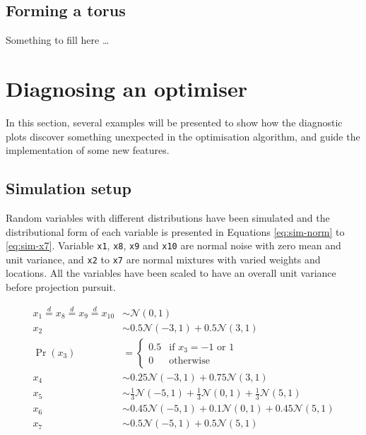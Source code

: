 \hypertarget{forming-a-torus}{%
\subsection{Forming a torus}\label{forming-a-torus}}

Something to fill here \ldots{}

\hypertarget{application}{%
\section{Diagnosing an optimiser}\label{application}}

In this section, several examples will be presented to show how the
diagnostic plots discover something unexpected in the optimisation
algorithm, and guide the implementation of some new features.

\hypertarget{simulation-setup}{%
\subsection{Simulation setup}\label{simulation-setup}}

Random variables with different distributions have been simulated and
the distributional form of each variable is presented in Equations
\ref{eq:sim-norm} to \ref{eq:sim-x7}. Variable \texttt{x1}, \texttt{x8},
\texttt{x9} and \texttt{x10} are normal noise with zero mean and unit
variance, and \texttt{x2} to \texttt{x7} are normal mixtures with varied
weights and locations. All the variables have been scaled to have an
overall unit variance before projection pursuit.

\begin{align}
x_1 \overset{d}{=} x_8 \overset{d}{=} x_9 \overset{d}{=} x_{10}& \sim \mathcal{N}(0, 1) \label{eq:sim-norm} \\
x_2 &\sim 0.5 \mathcal{N}(-3, 1) + 0.5 \mathcal{N}(3, 1)\label{eq:sim-x2}\\
\Pr(x_3) &= 
\begin{cases}
0.5 & \text{if $x_3 = -1$ or $1$}\\
0 & \text{otherwise}
\end{cases}\label{eq:sim-x3}\\
x_4 &\sim 0.25 \mathcal{N}(-3, 1) + 0.75 \mathcal{N}(3, 1) \label{eq:sim-x4}\\
x_5 &\sim \frac{1}{3} \mathcal{N}(-5, 1) + \frac{1}{3} \mathcal{N}(0, 1) + \frac{1}{3} \mathcal{N}(5, 1)\label{eq:sim-x5}\\
x_6 &\sim 0.45 \mathcal{N}(-5, 1) + 0.1 \mathcal{N}(0, 1) + 0.45 \mathcal{N}(5, 1)\label{eq:sim-x6}\\
x_7 &\sim 0.5 \mathcal{N}(-5, 1) + 0.5 \mathcal{N}(5, 1) 
\label{eq:sim-x7}
\end{align}

